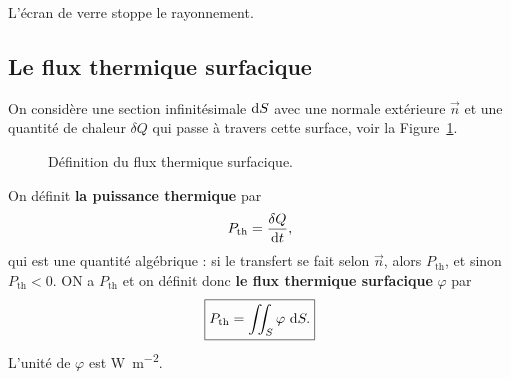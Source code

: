         \begin{example}
            L'écran de verre stoppe le rayonnement.
        \end{example}
    
    \subsection{Le flux thermique surfacique}

        On considère une section infinitésimale $\mathrm{d} S$ avec une normale extérieure $\vec{n}$ et une quantité de chaleur $\delta Q$ qui passe à travers cette surface, voir la Figure~\ref{fig:flux_thermique_surfacique_section}.

        \begin{figure}
            \centering
            \caption{Définition du flux thermique surfacique.}    
            \label{fig:flux_thermique_surfacique_section}
        \end{figure}

        \begin{definition}
            On définit \textbf{la puissance thermique} par 
            \begin{equation*}
                P_{\text{th}}=\frac{\delta Q}{\mathrm{d} t},    
            \end{equation*}
            qui est une quantité algébrique : si le transfert se fait selon $\vec{n}$, alors $P_{\text{th}}$, et sinon $P_{\text{th}}<0$. ON a $P_{\text{th}}$ et on définit donc \textbf{le flux thermique surfacique} $\varphi$ par
            \begin{equation*}
                \boxed{
                    P_{\text{th}}=\iint_{S}\varphi~\mathrm{d} S.
                }
            \end{equation*} 
            L'unité de $\varphi$ est \si{\watt\per\metre\squared}.
        \end{definition}

